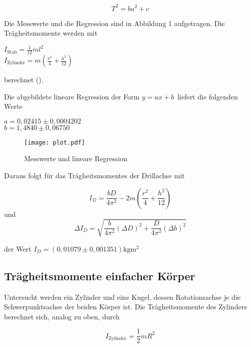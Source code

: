 \begin{equation}
  \label{eqn:linReg}
  T^2 = ba^2+c
\end{equation}

Die Messwerte und die Regression sind in Abbildung 1 aufgetragen. Die Trägheitsmomente werden mit
\begin{center}
  $I_{\text{Stab}} = \frac{1}{12} ml^2 $ \\
  $I_{\text{Zylinder}} = m (\frac{r^2}{4} +\frac{h^2}{12}) $ \\
\end{center}
berechnet (\cite{Anleitung}).

Die abgebildete lineare Regression der Form $ y = ax + b \,$ liefert die folgenden Werte

\begin{center}
  $ a = 0,02415 \pm 0,0004202 $ \\
  $ b = 1,4840 \pm 0,06750 $ \\
\end{center}

\begin{figure}
  \centering
  \texttt{[image: plot.pdf]}
  \caption{Messwerte und lineare Regression}
  \label{fig:Plot}
\end{figure}

Daraus folgt für das Trägheitsmomentes der Drillachse mit

\begin{equation}
  I_D = \frac{bD}{4 \pi ^2} - 2m (\frac{r^2}{4} + \frac{h^2}{12})
\end{equation}
und
\begin{equation}
  \Delta I_D = \sqrt{\frac{b}{4 \pi ^2}  (\Delta D)^2 + \frac{D}{4 \pi ^2}  (\Delta b)^2}
\end{equation}

der Wert $I_D = (0,01079 \pm 0,001351) \si{\kilogram\meter^2} $

\subsection{Trägheitsmomente einfacher Körper}
\label{sec:Trägheitsmomente einfacher Körper}

Untersucht werden ein Zylinder und eine Kugel, dessen Rotationsachse je die Schwerpunktsachse der beiden Körper ist.
Die Trägheitsmomente des Zylinders berechnet sich, analog zu oben, durch

\begin{equation}
  I_{\text{Zylinder}} = \frac{1}{2} mR^2
\end{equation}

